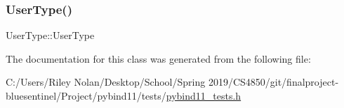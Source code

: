 \mbox{\label{class_inc_type_aa61d8a4462ac6fe39a0cfc85ee93b19a}} 
\subsubsection{\texorpdfstring{UserType()}{UserType()}\hspace{0.1cm}{\footnotesize\ttfamily [2/2]}}
{\footnotesize\ttfamily User\+Type\+::\+User\+Type\hspace{0.3cm}{\ttfamily [inline]}}



The documentation for this class was generated from the following file\+:\begin{DoxyCompactItemize}
\item 
C\+:/\+Users/\+Riley Nolan/\+Desktop/\+School/\+Spring 2019/\+C\+S4850/git/finalproject-\/bluesentinel/\+Project/pybind11/tests/\mbox{\hyperlink{pybind11__tests_8h}{pybind11\+\_\+tests.\+h}}\end{DoxyCompactItemize}
